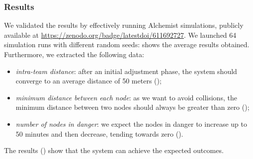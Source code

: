 \subsubsection{Results}
We validated the results by effectively running Alchemist simulations, 
 publicly available at \url{https://zenodo.org/badge/latestdoi/611692727}. 
%
We launched 64 simulation runs with different random seeds: 
  shows the average results obtained. 
Furthermore, we extracted the following data:
\begin{itemize}
  \item \emph{intra-team distance}:
   after an initial adjustment phase, 
   the system should converge to an average distance of 50 meters ();
  \item \emph{minimum distance between each node}: 
    as we want to avoid collisions, 
    the minimum distance between 
    two nodes should always be greater than zero ();
  \item \emph{number of nodes in danger}: 
   we expect the nodes in danger to increase 
   up to 50 minutes and then decrease, tending towards zero ().
\end{itemize}
The results () show that the system can achieve the expected outcomes.
